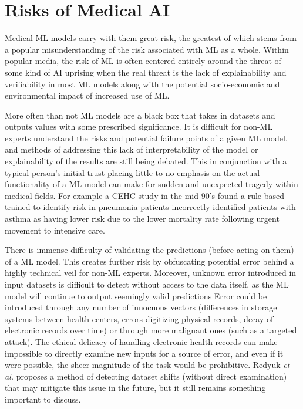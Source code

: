 \documentclass[]{article}
\begin{document}
	\section{Risks of Medical AI}
		Medical ML models carry with them great risk, the greatest of which stems from a popular misunderstanding of the risk associated with ML as a whole. Within popular media, the risk of ML is often centered entirely around the threat of some kind of AI uprising when the real threat is the lack of explainability and verifiability in most ML models along with the potential socio-economic and environmental impact of increased use of ML.\cite{bbc2016rroai,emerj2019roawrtiwwa}

		More often than not ML models are a black box that takes in datasets and outputs values with some prescribed significance. It is difficult for non-ML experts understand the risks and potential failure points of a given ML model, and methods of addressing this lack of interpretability of the model or explainability of the results are still being debated.\cite{10.1145/2858036.2858529, 10.1145/3328519.3329126} This in conjunction with a typical person's initial trust placing little to no emphasis on the actual functionality of a ML model\cite{siau2018building} can make for sudden and unexpected tragedy within medical fields. For example a CEHC study in the mid 90's found a rule-based trained to identify risk in pneumonia patients incorrectly identified patients with asthma as having lower risk due to the lower mortality rate following urgent movement to intensive care.\cite{caruana2015intelligible}

		There is immense difficulty of validating the predictions (before acting on them) of a ML model. This creates further risk by obfuscating potential error behind a highly technical veil for non-ML experts. Moreover, unknown error introduced in input datasets is difficult to detect without access to the data itself, as the ML model will continue to output seemingly valid predictions\cite{10.1145/3328519.3329126} Error could be introduced through any number of innocuous vectors (differences in storage systems between health centers, errors digitizing physical records, decay of electronic records over time) or through more malignant ones (such as a targeted attack). The ethical delicacy of handling electronic health records can make impossible to directly examine new inputs for a source of error, and even if it were possible, the sheer magnitude of the task would be prohibitive. Redyuk \emph{et al.} proposes a method of detecting dataset shifts (without direct examination) that may mitigate this issue in the future\cite{10.1145/3328519.3329126}, but it still remains something important to discuss.
\end{document}
